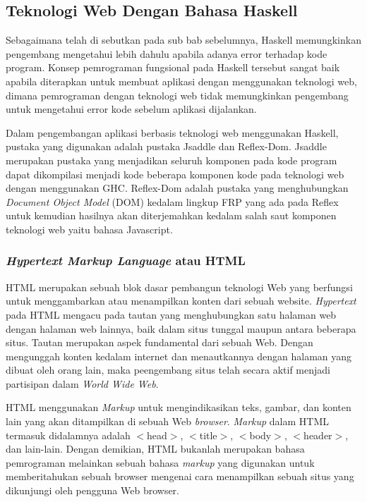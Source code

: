 \documentclass[pi.tex]{subfile}
\begin{document}
\subsection{Teknologi Web Dengan Bahasa Haskell}
Sebagaimana telah di sebutkan pada sub bab sebelumnya, Haskell memungkinkan pengembang mengetahui lebih dahulu apabila adanya error terhadap kode program. Konsep pemrograman fungsional pada Haskell tersebut sangat baik apabila diterapkan untuk membuat aplikasi dengan menggunakan teknologi web, dimana pemrograman dengan teknologi web tidak memungkinkan pengembang untuk mengetahui error kode sebelum aplikasi dijalankan.

Dalam pengembangan aplikasi berbasis teknologi web menggunakan Haskell, pustaka yang digunakan adalah pustaka Jsaddle dan Reflex-Dom. Jsaddle merupakan pustaka yang menjadikan seluruh komponen pada kode program dapat dikompilasi menjadi kode beberapa komponen kode pada teknologi web dengan menggunakan GHC. Reflex-Dom adalah pustaka yang menghubungkan \emph{Document Object Model} (DOM) kedalam lingkup FRP yang ada pada Reflex untuk kemudian hasilnya akan diterjemahkan kedalam salah saut komponen teknologi web yaitu bahasa Javascript.

\subsubsection{\emph{Hypertext Markup Language} atau HTML}
HTML merupakan sebuah blok dasar pembangun teknologi Web yang berfungsi untuk menggambarkan atau menampilkan konten dari sebuah website. \emph{Hypertext} pada HTML mengacu pada tautan yang menghubungkan satu halaman web dengan halaman web lainnya, baik dalam situs tunggal maupun antara beberapa situs. Tautan merupakan aspek fundamental dari sebuah Web. Dengan mengunggah konten kedalam internet dan menautkannya dengan halaman yang dibuat oleh orang lain, maka peengembang situs telah secara aktif menjadi partisipan dalam \emph{World Wide Web}.

HTML menggunakan \emph{Markup} untuk mengindikasikan teks, gambar, dan konten lain yang akan ditampilkan di sebuah Web \emph{browser}. \emph{Markup} dalam HTML termasuk didalamnya adalah $<$head$>$, $<$title$>$, $<$body$>$, $<$header$>$, dan lain-lain. Dengan demikian, HTML bukanlah merupakan bahasa pemrograman melainkan sebuah bahasa \emph{markup} yang digunakan untuk memberitahukan sebuah browser mengenai cara menampilkan sebuah situs yang dikunjungi oleh pengguna Web browser.
\end{document}
